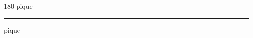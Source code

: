 
\begin{frame}
\begin{center}
\begin{turn}{180}
{\fontsize{2.5cm}{1em}\selectfont pique}
\end{turn}
\vspace{1em}\par  
\hrule
\vspace{1em}\par  
{\fontsize{2.5cm}{1em}\selectfont pique}
\end{center}
\end{frame}
